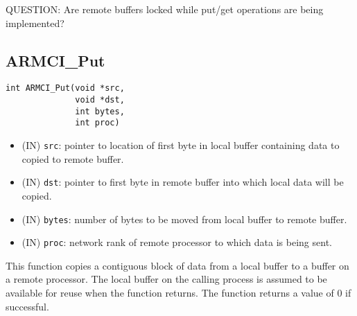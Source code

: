 \documentclass[12pt]{article}
\begin{document}
QUESTION: Are remote buffers locked while put/get operations are being
implemented?

\subsection{ARMCI\_Put}
\begin{verbatim}
int ARMCI_Put(void *src,
              void *dst,
              int bytes,
              int proc)
\end{verbatim}
\begin{itemize}
\item (IN) \texttt{src}: pointer to location of first byte in local buffer
containing data to copied to remote buffer.
\item (IN) \texttt{dst}: pointer to first byte in remote buffer into which local
data will be copied.
\item (IN) \texttt{bytes}: number of bytes to be moved from local buffer to
remote buffer.
\item (IN) \texttt{proc}: network rank of remote processor to which data is
being sent.
\end{itemize}
This function copies a contiguous block of data from a local buffer to a buffer
on a remote processor. The local buffer on the calling process is assumed to be
available for reuse when the function returns. The function returns a value of 0
if successful.
\end{document}
